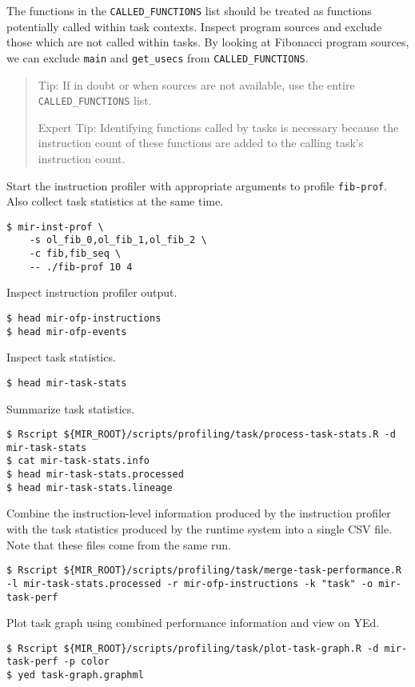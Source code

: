 \documentclass[11pt,a4paper]{article}
\begin{document}
The functions in the \texttt{CALLED\_FUNCTIONS} list should be treated as functions potentially called within task contexts.  Inspect program sources and exclude those which are not called within tasks.  By looking at Fibonacci program sources, we can exclude \texttt{main} and \texttt{get\_usecs} from \texttt{CALLED\_FUNCTIONS}. 
    
\begin{framed}
\begin{quote}
Tip: If in doubt or when sources are not available, use the entire \texttt{CALLED\_FUNCTIONS} list. 

Expert Tip: Identifying functions called by tasks is necessary because the instruction count of these functions are added to the calling task's instruction count. 
\end{quote}
\end{framed}

Start the instruction profiler with appropriate arguments to profile \texttt{fib-prof}.  Also collect task statistics at the same time.

\begin{lstlisting}[style=MyInputStyle]
$ mir-inst-prof \
    -s ol_fib_0,ol_fib_1,ol_fib_2 \
    -c fib,fib_seq \
    -- ./fib-prof 10 4
\end{lstlisting}

Inspect instruction profiler output. 

\begin{lstlisting}[style=MyInputStyle]
$ head mir-ofp-instructions
$ head mir-ofp-events
\end{lstlisting}

Inspect task statistics.

\begin{lstlisting}[style=MyInputStyle]
$ head mir-task-stats
\end{lstlisting}

Summarize task statistics.

\begin{lstlisting}[style=MyInputStyle]
$ Rscript ${MIR_ROOT}/scripts/profiling/task/process-task-stats.R -d mir-task-stats
$ cat mir-task-stats.info
$ head mir-task-stats.processed
$ head mir-task-stats.lineage
\end{lstlisting}

Combine the instruction-level information produced by the instruction profiler with the task statistics produced by the runtime system into a single CSV file. Note that these files come from the same run.

\begin{lstlisting}[style=MyInputStyle]
$ Rscript ${MIR_ROOT}/scripts/profiling/task/merge-task-performance.R -l mir-task-stats.processed -r mir-ofp-instructions -k "task" -o mir-task-perf
\end{lstlisting}

Plot task graph using combined performance information and view on YEd.

\begin{lstlisting}[style=MyInputStyle]
$ Rscript ${MIR_ROOT}/scripts/profiling/task/plot-task-graph.R -d mir-task-perf -p color
$ yed task-graph.graphml
\end{lstlisting}
\end{document}
